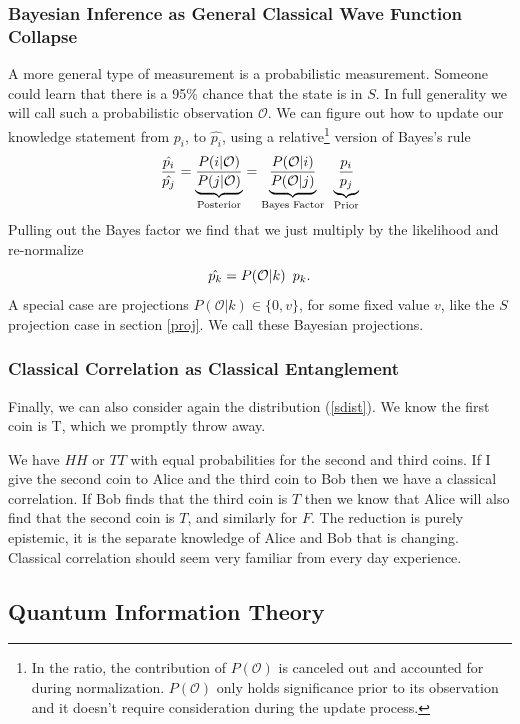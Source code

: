 \documentclass[12pt,a4paper]{article}
\begin{document}
\subsubsection{Bayesian Inference as General Classical Wave Function Collapse}
A more general type of measurement is a probabilistic measurement.  Someone could learn that there is a 95\% chance that the state is in $S$.  In full generality we will call such a probabilistic observation $\mathcal{O}$.  We can figure out how to update our knowledge statement from $p_i$, to $\hat{p_i}$, using a relative\footnote{In the ratio, the contribution of $P(\mathcal{O})$ is canceled out and accounted for during normalization.  $P(\mathcal{O})$ only holds significance prior to its observation and it doesn't require consideration during the update process.} version of Bayes's rule
\[
  \frac{\hat{p_i}}{\hat{p_j}} = \underbrace{\frac{P(i | \mathcal{O})}{P(j | \mathcal{O})}}_\text{Posterior}
                              = \underbrace{\frac{P(\mathcal{O} | i)}{P(\mathcal{O}|j)}}_\text{Bayes Factor}  \hspace{0.07 in}  \underbrace{\frac{p_i}{p_j}}_\text{Prior}
\]
Pulling out the Bayes factor we find that we just multiply by the likelihood and re-normalize
\[
  \hat{p_k} =  P(\mathcal{O} | k) \hspace{0.07 in} p_k.
\]
A special case are projections $P(\mathcal{O} | k) \in \{0,v\}$, for some fixed value $v$, like the $S$ projection case in section \ref{proj}.  We call these Bayesian projections.

\subsubsection{Classical Correlation as Classical Entanglement}
Finally, we can also consider again the distribution (\ref{sdist}). We know the first coin is T, which we promptly throw away.

We have $HH$ or $TT$ with equal probabilities for the second and third coins.  If I give the second coin to Alice and the third coin to Bob then we have a classical correlation.  If Bob finds that the third coin is $T$ then we know that Alice will also find that the second coin is $T$, and similarly for $F$.  The reduction is purely epistemic, it is the separate knowledge of Alice and Bob that is changing.  Classical correlation should seem very familiar from every day experience.

\subsection{Quantum Information Theory}
\end{document}
